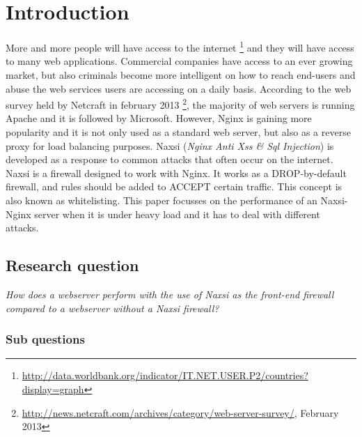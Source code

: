 \documentclass[Introduction]{subfiles}
\begin{document}
\section{Introduction}
\label{sec:Introduction}
More and more people will have access to the internet \footnote{\url{http://data.worldbank.org/indicator/IT.NET.USER.P2/countries?display=graph}} and they will have access to many web applications. Commercial companies have access to an ever growing market, but also criminals become more intelligent on how to reach end-users and abuse the web services users are accessing on a daily basis.
According to the web survey held by Netcraft in february 2013 \footnote{\url{http://news.netcraft.com/archives/category/web-server-survey/}, February 2013}, the majority of web servers is running Apache and it is followed by Microsoft. However, Nginx is gaining more popularity and it is not only used as a standard web server, but also as a reverse proxy for load balancing purposes. Naxsi (\emph{Nginx Anti Xss \& Sql Injection}) is developed as a response to common attacks that often occur on the internet. Naxsi is a firewall designed to work with Nginx. It works as a DROP-by-default firewall, and rules should be added to ACCEPT certain traffic. This concept is also known as whitelisting.
This paper focusses on the performance of an Naxsi-Nginx server when it is under heavy load and it has to deal with different attacks. 

\subsection{Research question}
\emph{How does a webserver perform with the use of Naxsi as the front-end firewall compared to a webserver without a Naxsi firewall?}

\subsubsection{Sub questions}
\end{document}
